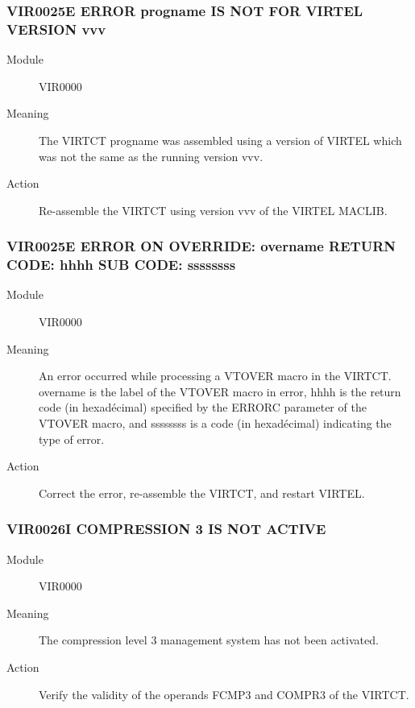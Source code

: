 \documentclass[letterpaper,10pt,english]{sphinxmanual}
\begin{document}
\subsubsection{VIR0025E ERROR progname IS NOT FOR VIRTEL VERSION vvv}
\label{\detokenize{messages:vir0025e-error-progname-is-not-for-virtel-version-vvv}}\begin{description}
\item[{Module}] \leavevmode
VIR0000

\item[{Meaning}] \leavevmode
The VIRTCT progname was assembled using a version of VIRTEL which was not the same as the running version vvv.

\item[{Action}] \leavevmode
Re-assemble the VIRTCT using version vvv of the VIRTEL MACLIB.

\end{description}


\subsubsection{VIR0025E ERROR ON OVERRIDE: overname RETURN CODE: hhhh SUB CODE: ssssssss}
\label{\detokenize{messages:vir0025e-error-on-override-overname-return-code-hhhh-sub-code-ssssssss}}\begin{description}
\item[{Module}] \leavevmode
VIR0000

\item[{Meaning}] \leavevmode
An error occurred while processing a VTOVER macro in the VIRTCT.  overname is the label of the VTOVER macro       in error, hhhh is the return code (in hexadécimal) specified by the ERRORC parameter of the VTOVER macro, and ssssssss is a code (in hexadécimal) indicating the type of error.

\item[{Action}] \leavevmode
Correct the error, re-assemble the VIRTCT, and restart VIRTEL.

\end{description}


\subsubsection{VIR0026I COMPRESSION 3 IS NOT ACTIVE}
\label{\detokenize{messages:vir0026i-compression-3-is-not-active}}\begin{description}
\item[{Module}] \leavevmode
VIR0000

\item[{Meaning}] \leavevmode
The compression level 3 management system has not been activated.

\item[{Action}] \leavevmode
Verify the validity of the operands FCMP3 and COMPR3 of the VIRTCT.

\end{description}
\end{document}
